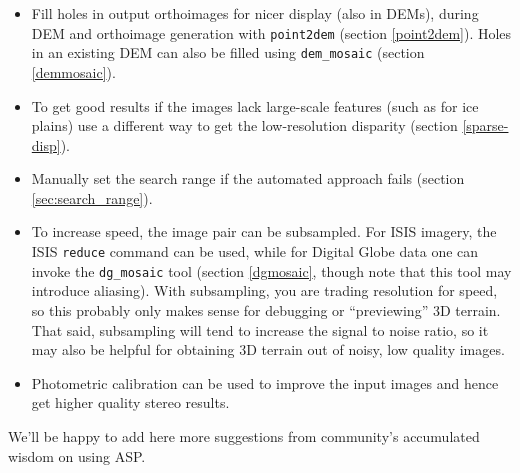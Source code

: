 \begin{itemize}
\item Fill holes in output orthoimages for nicer display (also in DEMs),
during DEM and orthoimage generation with \texttt{point2dem} (section
\ref{point2dem}). Holes in an existing DEM can also be filled using
\texttt{dem\_mosaic} (section \ref{demmosaic}).

\item To get good results if the images lack large-scale features (such
as for ice plains) use a different way to get the low-resolution
disparity (section \ref{sparse-disp}).

\item Manually set the search range if the automated approach fails
(section \ref{sec:search_range}).

\item To increase speed, the image pair can be subsampled. For ISIS
imagery, the ISIS \texttt{reduce} command can be used, while for Digital
Globe data one can invoke the \texttt{dg\_mosaic} tool (section
\ref{dgmosaic}, though note that this tool may introduce aliasing). With
subsampling, you are trading resolution for speed, so this probably only
makes sense for debugging or ``previewing'' 3D terrain. That said,
subsampling will tend to increase the signal to noise ratio, so it may
also be helpful for obtaining 3D terrain out of noisy, low quality
images.

\item Photometric calibration can be used to improve the input images
and hence get higher quality stereo results.

\end{itemize}

We'll be happy to add here more suggestions from community's accumulated
wisdom on using ASP.
